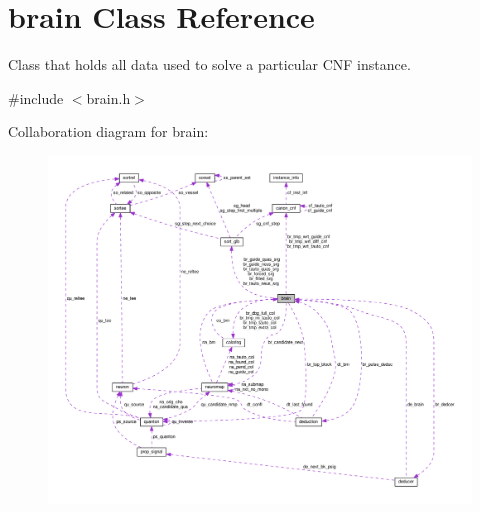 \hypertarget{classbrain}{\section{brain Class Reference}
\label{classbrain}
}


Class that holds all data used to solve a particular C\+N\+F instance.  




{\ttfamily \#include $<$brain.\+h$>$}



Collaboration diagram for brain\+:\nopagebreak
\begin{figure}[H]
\begin{center}
\leavevmode
\includegraphics[width=350pt]{da/dc9/classbrain__coll__graph}
\end{center}
\end{figure}
